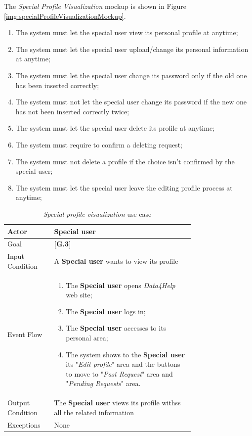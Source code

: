 The \textit{Special Profile Visualization} mockup is shown in Figure \ref{img:specialProfileVisualizationMockup}.

\begin{enumerate}
  \item The system must let the special user view its personal profile at anytime;
  \item The system must let the special user upload/change its personal information at anytime;
  \item The system must let the special user change its password only if the old one has been inserted correctly;
  \item The system must not let the special user change its password if the new one has not been inserted correctly twice;
  \item The system must let the special user delete its profile at anytime;
  \item The system must require to confirm a deleting request;
  \item The system must not delete a profile if the choice isn't confirmed by the special user;
  \item The system must let the special user leave the editing profile process at anytime;
\end{enumerate}

\begin{center}
\begin{table}
\begin{tabular}{ | l | p{0.75\linewidth} | }
  \hline
    Actor & \textbf{Special user} \\ \hline
    Goal & \textbf{[G.3]} \\ \hline
    Input Condition & A \textbf{Special user} wants to view its profile\\ \hline
    Event Flow & \begin{minipage}[t]{0.7\textwidth}
      \begin{enumerate}
        \item The \textbf{Special user } opens \textit{Data4Help} web site;
        \item The \textbf{Special user} logs in;
        \item The \textbf{Special user} accesses to its personal area;
        \item The system shows to the \textbf{Special user} its "\textit{Edit profile}" area and the buttons to move to "\textit{Past Request}" area and "\textit{Pending Requests}" area.
      \end{enumerate}
    \smallskip
  \end{minipage} \\ \hline
  Output Condition & The \textbf{Special user} views its profile withss all the related information\\ \hline
  Exceptions & None \\ \hline
\end{tabular}
\caption{\textit{Special profile visualization} use case}
\label{table:specialProfileVisualizationTable}
\end{table}
\end{center}

